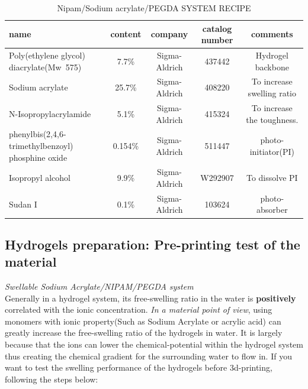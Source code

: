\documentclass[a4paper]{article}
\begin{document}
\begin{itemize}
\begin{table}[h!]
\caption{Nipam/Sodium acrylate/PEGDA SYSTEM RECIPE}
\begin{center}
    \begin{tabular}{ |p{5cm}| c | c | c | c |}
    \hline
    \textbf{name}&\textbf{content}&\textbf{company}&\textbf{catalog number}&\textbf{comments} \\ \hline
    Poly(ethylene glycol) diacrylate(Mw~575)&7.7\%&Sigma-Aldrich&437442& Hydrogel backbone\\     \hline
   Sodium acrylate&25.7\%&Sigma-Aldrich&408220&To increase swelling ratio\\ \hline
   N-Isopropylacrylamide&5.1\%&Sigma-Aldrich&415324&To increase the toughness.\\ \hline
     phenylbis(2,4,6-trimethylbenzoyl) phosphine                            oxide&0.154\%&Sigma-Aldrich&511447&photo-initiator(PI)\\
    \hline
    Isopropyl alcohol&9.9\%&Sigma-Aldrich&W292907&To dissolve PI\\      \hline
    Sudan I&0.1\%&Sigma-Aldrich&103624&photo-absorber \\
    \hline
    \end{tabular}
\end{center}
\end{table}
\pagebreak
\subsection{Hydrogels preparation: Pre-printing test of the material}
\textit{\textit{Swellable} Sodium Acrylate/NIPAM/PEGDA system}\\
   Generally in a hydrogel system, its free-swelling ratio in the water is \textbf{positively} correlated with the ionic concentration. \textit{In a material point of view}, using monomers with ionic property(Such as Sodium Acrylate or acrylic acid) can greatly increase the free-swelling ratio of the hydrogels in water. It is largely because that the ions can lower the chemical-potential within the hydrogel system thus creating the chemical gradient for the surrounding water to flow in. If you want to test the swelling performance of the hydrogels before 3d-printing, following the steps below:
  

\end{itemize}
\end{document}
